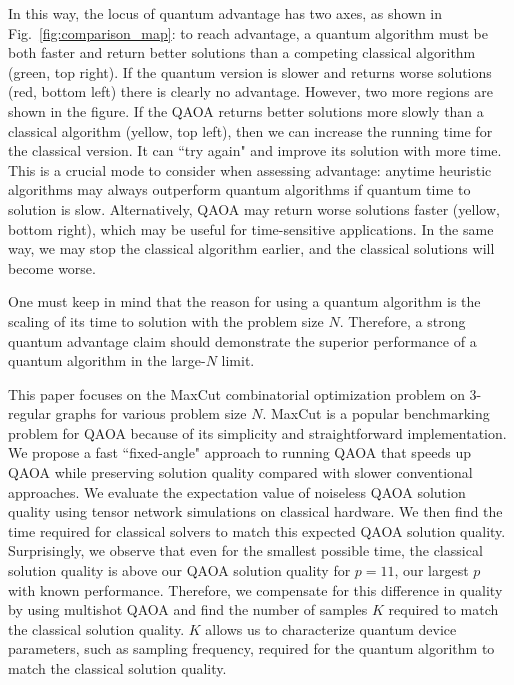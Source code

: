 \documentclass[prb,reprint,nofootinbib,longbibliography,superscriptaddress]{revtex4-1}
\begin{document}
In this way, the locus of quantum advantage has two axes, as shown in Fig.~\ref{fig:comparison_map}: to reach advantage, a quantum algorithm must be both faster and return better solutions than a competing classical algorithm (green, top right). If the quantum version is slower and returns worse solutions (red, bottom left) there is clearly no advantage. However,  two more regions are shown in the figure. If the QAOA returns better solutions more slowly than a classical algorithm (yellow, top left), then we can increase the running time for the classical version. It can ``try again" and improve its solution with more time. This is a crucial mode  to consider when assessing advantage: anytime heuristic algorithms may always outperform quantum algorithms if quantum time to solution is slow.
Alternatively, QAOA may return worse solutions faster (yellow, bottom right), which may be useful for time-sensitive applications.
In the same way, we may stop the classical algorithm earlier, and the classical solutions will become worse.

One must keep in mind that the reason for using a quantum algorithm is the scaling of its time to solution with the problem size $N$. 
Therefore, a strong quantum advantage claim should demonstrate the superior performance of a quantum algorithm in the large-$N$ limit.

This paper focuses on the MaxCut combinatorial optimization problem on 3-regular graphs for various problem size $N$. MaxCut is a popular benchmarking problem for QAOA because of its simplicity and straightforward implementation.
We propose a fast ``fixed-angle" approach to running QAOA that speeds up QAOA while preserving solution quality compared with slower conventional approaches.
We evaluate the expectation value of noiseless QAOA solution quality using tensor network simulations on classical hardware. We then find the time required for classical solvers to match this expected QAOA solution quality.
Surprisingly, we observe that even for the smallest possible time, the classical solution quality is above our QAOA solution quality for $p=11$, our largest $p$ with known performance.
Therefore, we compensate for this difference in quality by using multishot QAOA and find the number of samples $K$ required to match the classical solution quality.
$K$ allows us to characterize quantum device parameters, such as sampling frequency, required for the quantum algorithm to match the classical solution quality.
\end{document}
